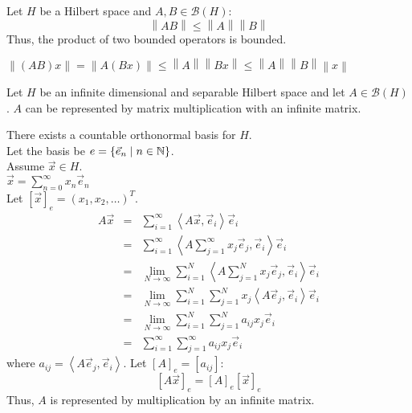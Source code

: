 \documentclass[letterpaper,12pt,fleqn]{article}
\newcommand{\ve}{\vec{e}}
\newcommand{\vx}{\vec{x}}
\newcommand{\norm}[1]{\left\|#1\right\|}
\newcommand{\inner}[1]{\left<#1\right>}
\newcommand{\mb}{\mathcal{B}}
\begin{document}
\begin{theorem}
  Let $H$ be a Hilbert space and $A,B\in\mb(H)$:
  \[\norm{AB}\le\norm{A}\norm{B}\]
  Thus, the product of two bounded operators is bounded.
\end{theorem}

\begin{theproof}
  $\norm{(AB)x}=\norm{A(Bx)}\le\norm{A}\norm{Bx}\le\norm{A}\norm{B}\norm{x}$
\end{theproof}

\begin{theorem}
  Let $H$ be an infinite dimensional and separable Hilbert space and let
  $A\in\mb(H)$. $A$ can be represented by matrix multiplication with an
  infinite matrix.
\end{theorem}

\begin{theproof}
  There exists a countable orthonormal basis for $H$. \\
  Let the basis be $e=\{\ve_n\mid n\in\N\}$. \\
  Assume $\vx\in H$. \\
  $\vx=\sum_{n=0}^{\infty}x_n\ve_n$ \\
  Let $[\vx]_e=(x_1,x_2,\ldots)^T$.
  \begin{eqnarray*}
    A\vx &=& \sum_{i=1}^{\infty}\inner{A\vx,\ve_i}\ve_i \\
    &=& \sum_{i=1}^{\infty}\inner{A\sum_{j=1}^{\infty}x_j\ve_j,\ve_i}\ve_i \\
    &=& \lim_{N\to\infty}\sum_{i=1}^N\inner{A\sum_{j=1}^Nx_j\ve_j,\ve_i}\ve_i \\
    &=& \lim_{N\to\infty}\sum_{i=1}^N\sum_{j=1}^Nx_j\inner{A\ve_j,\ve_i}\ve_i \\
    &=& \lim_{N\to\infty}\sum_{i=1}^N\sum_{j=1}^Na_{ij}x_j\ve_i \\
    &=& \sum_{i=1}^{\infty}\sum_{j=1}^{\infty}a_{ij}x_j\ve_i
  \end{eqnarray*}
  where $a_{ij}=\inner{A\ve_j,\ve_i}$.
  Let $[A]_e=[a_{ij}]$:
  \[[A\vx]_e=[A]_e[\vx]_e\]
  Thus, $A$ is represented by multiplication by an infinite matrix.
\end{theproof}
\end{document}
